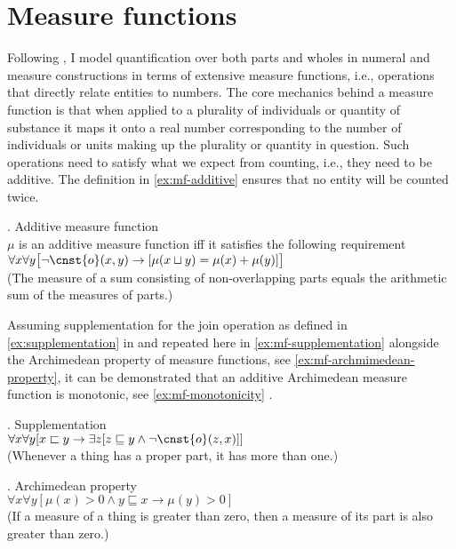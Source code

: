 	\section{Measure functions}\label{sec:measure-functions}
	
	Following \citet{krifka1989nominal,krifka1995common}, I model quantification over both parts and wholes in numeral and measure constructions in terms of extensive measure functions, i.e., operations that directly relate entities to numbers. The core mechanics behind a measure function is that when applied to a plurality of individuals or quantity of substance it maps it onto a real number corresponding to the number of individuals or units making up the plurality or quantity in question. Such operations need to satisfy what we expect from counting, i.e., they need to be additive. The definition in \ref{ex:mf-additive} ensures that no entity will be counted twice.
	
	\ex. Additive measure function\\
	$\mu$ is an additive measure function iff it satisfies the following requirement\\
	$\forall x\forall y\big[\neg\cnst{o}(x,y) \rightarrow [\mu(x \sqcup y) = \mu(x) + \mu(y)]\big]$\\
	(The measure of a sum consisting of non-overlapping parts equals the arithmetic sum of the measures of parts.)\label{ex:mf-additive}
	
	Assuming supplementation for the join operation as defined in \ref{ex:supplementation} in   and repeated here in \ref{ex:mf-supplementation} alongside the Archimedean property of measure functions, see \ref{ex:mf-archmimedean-property}, it can be demonstrated that an additive Archimedean measure function is monotonic, see \ref{ex:mf-monotonicity}  \citep[see][]{schwarzschild2002grammar}.
	
	\ex. Supplementation\\
	$\forall x\forall y[x \sqsubset y \rightarrow \exists z[z \sqsubseteq y \wedge \neg\cnst{o}(z,x)]]$\\
	(Whenever a thing has a proper part, it has more than one.)\label{ex:mf-supplementation}
	
	\ex. Archimedean property\\
	$\forall x\forall y[\mu(x) > 0 \wedge y \sqsubseteq x \rightarrow \mu(y) > 0]$\\
	(If a measure of a thing is greater than zero, then a measure of its part is also greater than zero.)\label{ex:mf-archmimedean-property}
	
